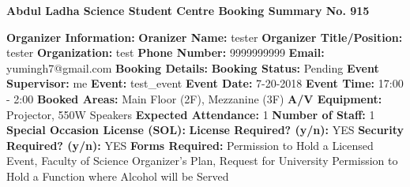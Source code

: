 \documentclass{article}%
\begin{document}
%
\begin{center}%
\textbf{Abdul Ladha Science Student Centre Booking Summary No. 915}%
\end{center}%
\textbf{ }%
\newline%
\textbf{Organizer Information:}%
\newline%
\textbf{Oranizer Name: }%
tester%
\newline%
\textbf{Organizer Title/Position: }%
tester%
\newline%
\textbf{Organization: }%
test%
\newline%
\textbf{Phone Number: }%
9999999999%
\newline%
\textbf{Email: }%
yumingh7@gmail.com%
\newline%
\newline%
\textbf{Booking Details: }%
\newline%
\textbf{Booking Status: }%
Pending%
\newline%
\textbf{Event Supervisor: }%
me%
\newline%
\textbf{Event: }%
test\_event%
\newline%
\textbf{Event Date: }%
7{-}20{-}2018%
\newline%
\textbf{Event Time: }%
17:00 {-} 2:00%
\newline%
\textbf{Booked Areas: }%
Main Floor (2F), Mezzanine (3F)%
\newline%
\textbf{A/V Equipment: }%
Projector, 550W Speakers%
\newline%
\textbf{Expected Attendance: }%
1%
\newline%
\textbf{Number of Staff: }%
1%
\newline%
\newline%
\textbf{Special Occasion License (SOL): }%
\newline%
\textbf{License Required? (y/n): }%
YES%
\newline%
\textbf{Security Required? (y/n): }%
YES%
\newline%
\textbf{Forms Required: }%
Permission to Hold a Licensed Event, Faculty of Science Organizer’s Plan,             Request for University Permission to Hold a Function where Alcohol will be Served%
\newline%
\end{document}
